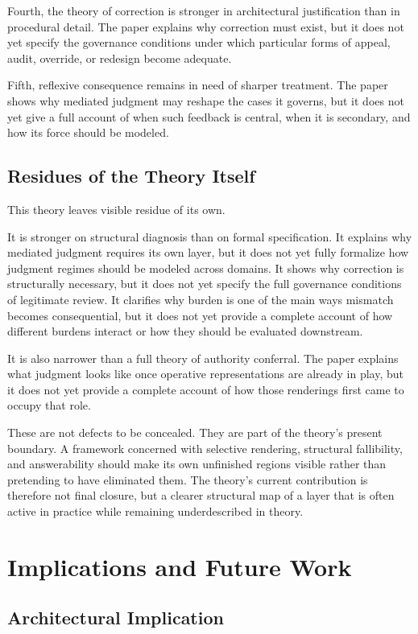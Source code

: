 \documentclass[11pt]{article}
\begin{document}
Fourth, the theory of correction is stronger in architectural justification than in procedural detail. The paper explains why correction must exist, but it does not yet specify the governance conditions under which particular forms of appeal, audit, override, or redesign become adequate.

Fifth, reflexive consequence remains in need of sharper treatment. The paper shows why mediated judgment may reshape the cases it governs, but it does not yet give a full account of when such feedback is central, when it is secondary, and how its force should be modeled.

\subsection{Residues of the Theory Itself}

This theory leaves visible residue of its own.

It is stronger on structural diagnosis than on formal specification. It explains why mediated judgment requires its own layer, but it does not yet fully formalize how judgment regimes should be modeled across domains. It shows why correction is structurally necessary, but it does not yet specify the full governance conditions of legitimate review. It clarifies why burden is one of the main ways mismatch becomes consequential, but it does not yet provide a complete account of how different burdens interact or how they should be evaluated downstream.

It is also narrower than a full theory of authority conferral. The paper explains what judgment looks like once operative representations are already in play, but it does not yet provide a complete account of how those renderings first came to occupy that role.

These are not defects to be concealed. They are part of the theory's present boundary. A framework concerned with selective rendering, structural fallibility, and answerability should make its own unfinished regions visible rather than pretending to have eliminated them. The theory's current contribution is therefore not final closure, but a clearer structural map of a layer that is often active in practice while remaining underdescribed in theory.
\section{Implications and Future Work}

\subsection{Architectural Implication}
\end{document}
